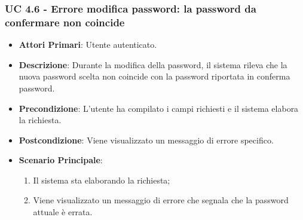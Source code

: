 			\subsubsection{UC 4.6 - Errore modifica password: la password da confermare non coincide}
			\begin{itemize}
				\item \textbf{Attori Primari}: Utente autenticato.
				\item \textbf{Descrizione}: Durante la modifica della password, il sistema rileva che la nuova password scelta non coincide con la password riportata in conferma password.
				\item \textbf{Precondizione}: L'utente ha compilato i campi richiesti e il sistema elabora la richiesta.
				\item \textbf{Postcondizione}: Viene visualizzato un messaggio di errore specifico.
				\item \textbf{Scenario Principale}:
				\begin{enumerate}
					\item Il sistema sta elaborando la richiesta;
					\item Viene visualizzato un messaggio di errore che segnala che la password attuale è errata.
				\end{enumerate}
			\end{itemize}
			

